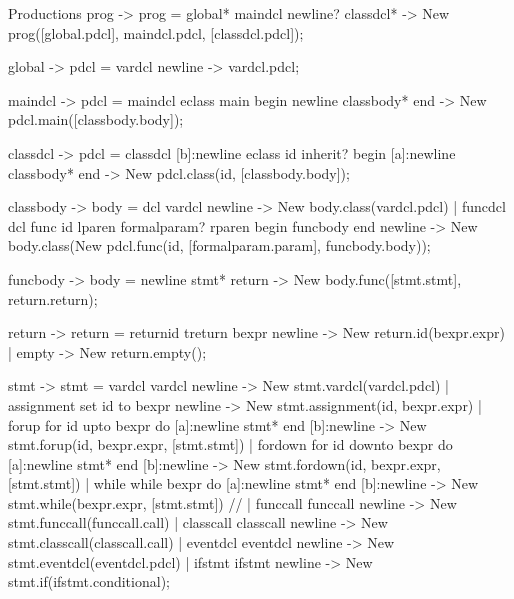 Productions \label{Productions}
    prog        {-> prog}   =   global* maindcl newline? classdcl*                      {-> New prog([global.pdcl], maindcl.pdcl, [classdcl.pdcl])};

    global      {-> pdcl}   =   vardcl newline                                          {-> vardcl.pdcl};

    maindcl     {-> pdcl}   =   {maindcl} eclass main begin newline classbody* end      {-> New pdcl.main([classbody.body])};

    classdcl    {-> pdcl}   =   {classdcl} [b]:newline eclass id inherit? begin [a]:newline classbody* end    {-> New pdcl.class(id, [classbody.body])};

    classbody   {-> body}   =   {dcl} vardcl newline                                                            {-> New body.class(vardcl.pdcl)}
                            |   {funcdcl} dcl func id lparen formalparam? rparen begin funcbody end newline     {-> New body.class(New pdcl.func(id, [formalparam.param], funcbody.body))};

    funcbody    {-> body}   =   newline stmt* return                                    {-> New body.func([stmt.stmt], return.return)};

    return      {-> return} =   {returnid} treturn bexpr newline                        {-> New return.id(bexpr.expr)}
                            |   {empty}                                                 {-> New return.empty()};


    stmt        {-> stmt}   =   {vardcl} vardcl newline                                        {-> New stmt.vardcl(vardcl.pdcl)}
                            |   {assignment} set id to bexpr newline                           {-> New stmt.assignment(id, bexpr.expr)}
                            |   {forup} for id upto bexpr do [a]:newline stmt* end [b]:newline         {-> New stmt.forup(id, bexpr.expr, [stmt.stmt])}
                            |   {fordown} for id downto bexpr do [a]:newline stmt* end [b]:newline     {-> New stmt.fordown(id, bexpr.expr, [stmt.stmt])}
                            |   {while} while bexpr do [a]:newline stmt* end [b]:newline               {-> New stmt.while(bexpr.expr, [stmt.stmt])}
                         //   |   {funccall} funccall newline                                    {-> New stmt.funccall(funccall.call)}
                            |   {classcall} classcall newline                                  {-> New stmt.classcall(classcall.call)}
                            |   {eventdcl} eventdcl newline                                    {-> New stmt.eventdcl(eventdcl.pdcl)}
                            |   {ifstmt} ifstmt newline                                        {-> New stmt.if(ifstmt.conditional)};

